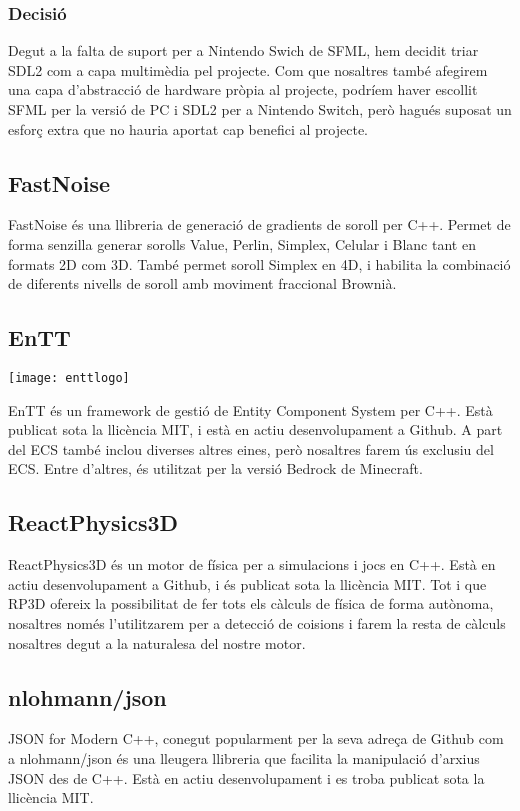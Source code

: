 \subsubsection{Decisió}
Degut a la falta de suport per a Nintendo Swich de SFML, hem decidit triar SDL2 com a capa multimèdia pel projecte. Com que nosaltres també afegirem una capa d'abstracció de hardware pròpia al projecte, podríem haver escollit SFML per la versió de PC i SDL2 per a Nintendo Switch, però hagués suposat un esforç extra que no hauria aportat cap benefici al projecte.

\subsection{FastNoise}
FastNoise és una llibreria de generació de gradients de soroll per C++. Permet de forma senzilla generar sorolls Value, Perlin, Simplex, Celular i Blanc tant en formats 2D com 3D. També permet soroll Simplex en 4D, i habilita la combinació de diferents nivells de soroll amb moviment fraccional Brownià.
\subsection{EnTT}
\begin{center}
  \texttt{[image: enttlogo]}
\end{center}
EnTT és un framework de gestió de Entity Component System per C++. Està publicat sota la llicència MIT, i està en actiu desenvolupament a Github. A part del ECS també inclou diverses altres eines, però nosaltres farem ús exclusiu del ECS. Entre d'altres, és utilitzat per la versió Bedrock de Minecraft.
\subsection{ReactPhysics3D}
ReactPhysics3D és un motor de física per a simulacions i jocs en C++. Està en actiu desenvolupament a Github, i és publicat sota la llicència MIT. Tot i que RP3D ofereix la possibilitat de fer tots els càlculs de física de forma autònoma, nosaltres només l'utilitzarem per a detecció de co\lgem isions i farem la resta de càlculs nosaltres degut a la naturalesa del nostre motor.
\subsection{nlohmann/json}
JSON for Modern C++, conegut popularment per la seva adreça de Github com a nlohmann/json és una lleugera llibreria que facilita la manipulació d'arxius JSON des de C++. Està en actiu desenvolupament i es troba publicat sota la llicència MIT.

